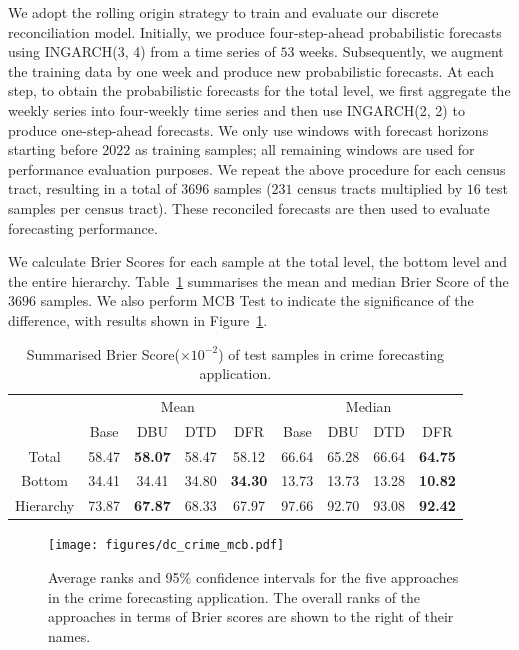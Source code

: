 \documentclass[a4paper,review,12pt,authoryear]{elsarticle}
\theoremstyle{definition}
\begin{document}
     We adopt the rolling origin strategy to train and evaluate our discrete reconciliation model.
     Initially, we produce four-step-ahead probabilistic forecasts using INGARCH(3, 4) from a time series of $53$ weeks.
     Subsequently, we augment the training data by one week and produce new probabilistic forecasts.
     At each step, to obtain the probabilistic forecasts for the total level, we first aggregate the weekly series into four-weekly time series and then use INGARCH(2, 2) to produce one-step-ahead forecasts.
     We only use windows with forecast horizons starting before $2022$ as training samples; all remaining windows are used for performance evaluation purposes.
     We repeat the above procedure for each census tract, resulting in a total of $3696$ samples ($231$ census tracts multiplied by $16$ test samples per census tract).
     These reconciled forecasts are then used to evaluate forecasting performance.

     We calculate Brier Scores for each sample at the total level, the bottom level and the entire hierarchy.
     Table~\ref{tab:crime_bs} summarises the mean and median Brier Score of the $3696$ samples.
     We also perform MCB Test to indicate the significance of the difference, with results shown in Figure~\ref{fig:application_crime}.

     \begin{table}[h]
       \centering
       \caption{\label{tab:crime_bs}Summarised Brier Score($\times 10^{-2}$) of test samples in crime forecasting application.}
       \begin{tabular}{ccccccccc}
       \toprule
       &\multicolumn{4}{c}{Mean}
       & \multicolumn{4}{c}{Median} \\ \cmidrule(lr){2-5} \cmidrule(lr){6-9}
        & Base & DBU & DTD & DFR &  Base & DBU & DTD & DFR \\\midrule
       Total & 58.47 & \textbf{58.07} & 58.47 & 58.12 & 66.64 & 65.28 & 66.64 & \textbf{64.75} \\
       Bottom & 34.41 & 34.41 & 34.80 & \textbf{34.30} & 13.73 & 13.73 & 13.28 & \textbf{10.82}\\
       Hierarchy & 73.87 & \textbf{67.87} & 68.33 & 67.97 & 97.66 & 92.70 & 93.08 & \textbf{92.42}\\
       \bottomrule
       \end{tabular}
       \end{table}

     \begin{figure}[h]
       \caption{\label{fig:application_crime}Average ranks and 95\% confidence intervals for the five approaches in the crime forecasting application. The overall ranks of the approaches in terms of Brier scores are shown to the right of their names.}
       \centering
       \texttt{[image: figures/dc\_crime\_mcb.pdf]}
     \end{figure}
\end{document}
